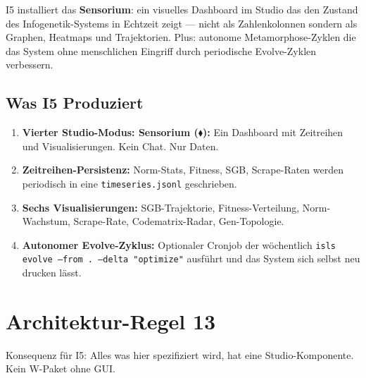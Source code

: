 \documentclass[11pt,a4paper]{article}
\begin{document}
I5 installiert das \textbf{Sensorium}: ein visuelles Dashboard 
im Studio das den Zustand des Infogenetik-Systems in Echtzeit 
zeigt --- nicht als Zahlenkolonnen sondern als Graphen, 
Heatmaps und Trajektorien. Plus: autonome Metamorphose-Zyklen 
die das System ohne menschlichen Eingriff durch periodische 
Evolve-Zyklen verbessern.

\subsection{Was I5 Produziert}

\begin{enumerate}[nosep]
\item \textbf{Vierter Studio-Modus: Sensorium ($\blacklozenge$):} 
      Ein Dashboard mit Zeitreihen und Visualisierungen. 
      Kein Chat. Nur Daten.
\item \textbf{Zeitreihen-Persistenz:} Norm-Stats, Fitness, SGB, 
      Scrape-Raten werden periodisch in eine 
      \texttt{timeseries.jsonl} geschrieben.
\item \textbf{Sechs Visualisierungen:} SGB-Trajektorie, 
      Fitness-Verteilung, Norm-Wachstum, Scrape-Rate, 
      Codematrix-Radar, Gen-Topologie.
\item \textbf{Autonomer Evolve-Zyklus:} Optionaler Cronjob 
      der w\"ochentlich \texttt{isls evolve --from . --delta 
      "optimize"} ausf\"uhrt und das System sich selbst 
      neu drucken l\"asst.
\end{enumerate}


\section{Architektur-Regel 13}

\begin{center}
\end{center}

Konsequenz f\"ur I5: Alles was hier spezifiziert wird, hat 
eine Studio-Komponente. Kein W-Paket ohne GUI.
\end{document}
